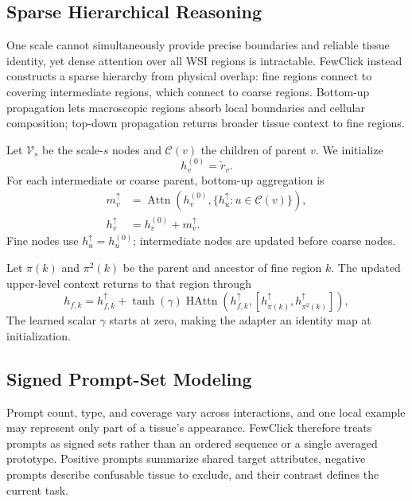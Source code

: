 \documentclass[letterpaper]{article}
\begin{document}
\subsection{Sparse Hierarchical Reasoning}
One scale cannot simultaneously provide precise boundaries and reliable tissue identity, yet dense attention over all WSI regions is intractable. FewClick instead constructs a sparse hierarchy from physical overlap: fine regions connect to covering intermediate regions, which connect to coarse regions. Bottom-up propagation lets macroscopic regions absorb local boundaries and cellular composition; top-down propagation returns broader tissue context to fine regions.

Let $\mathcal{V}_s$ be the scale-$s$ nodes and $\mathcal{C}(v)$ the children of parent $v$. We initialize
\begin{equation}
h_v^{(0)}=\widetilde r_v.
\label{eq:hier-init}
\end{equation}
For each intermediate or coarse parent, bottom-up aggregation is
\begin{equation}
\begin{split}
m_v^{\uparrow}
&=\operatorname{Attn}\!\left(
h_v^{(0)},\{h_u^{\uparrow}:u\in\mathcal{C}(v)\}
\right),\\
h_v^{\uparrow}&=h_v^{(0)}+m_v^{\uparrow}.
\end{split}
\label{eq:bottom-up}
\end{equation}
Fine nodes use $h_u^{\uparrow}=h_u^{(0)}$; intermediate nodes are updated before coarse nodes.

Let $\pi(k)$ and $\pi^2(k)$ be the parent and ancestor of fine region $k$. The updated upper-level context returns to that region through
\begin{equation}
h_{f,k}=h_{f,k}^{\uparrow}
+\tanh(\gamma)\operatorname{HAttn}\!\left(
h_{f,k}^{\uparrow},
[h_{\pi(k)}^{\uparrow},h_{\pi^2(k)}^{\uparrow}]
\right),
\label{eq:hierarchy}
\end{equation}
The learned scalar $\gamma$ starts at zero, making the adapter an identity map at initialization.

\subsection{Signed Prompt-Set Modeling}
Prompt count, type, and coverage vary across interactions, and one local example may represent only part of a tissue's appearance. FewClick therefore treats prompts as signed sets rather than an ordered sequence or a single averaged prototype. Positive prompts summarize shared target attributes, negative prompts describe confusable tissue to exclude, and their contrast defines the current task.
\end{document}
